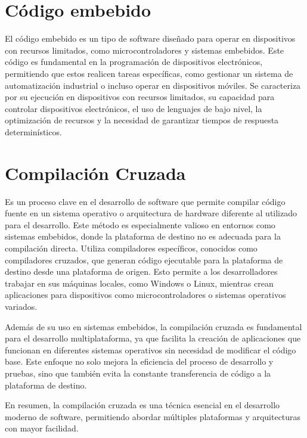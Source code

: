 \section{Código embebido}

El código embebido es un tipo de software diseñado para operar en dispositivos con recursos limitados, como microcontroladores y sistemas embebidos. Este código es fundamental en la programación de dispositivos electrónicos, permitiendo que estos realicen tareas específicas, como gestionar un sistema de automatización industrial o incluso operar en dispositivos móviles. Se caracteriza por su ejecución en dispositivos con recursos limitados, su capacidad para controlar dispositivos electrónicos, el uso de lenguajes de bajo nivel, la optimización de recursos y la necesidad de garantizar tiempos de respuesta 
determinísticos.

\section{Compilación Cruzada}

Es un proceso clave en el desarrollo de software que permite compilar código fuente en un sistema operativo o arquitectura de hardware diferente al utilizado para el desarrollo. Este método es especialmente valioso en entornos como sistemas embebidos, donde la plataforma de destino no es adecuada para la compilación directa. Utiliza compiladores específicos, conocidos como compiladores cruzados, que generan código ejecutable para la plataforma de destino desde una plataforma de origen. Esto permite a los desarrolladores trabajar en sus máquinas locales, como Windows o Linux, mientras crean aplicaciones para dispositivos como microcontroladores o sistemas operativos variados.

Además de su uso en sistemas embebidos, la compilación cruzada es fundamental para el desarrollo multiplataforma, ya que facilita la creación de aplicaciones que funcionan en diferentes sistemas operativos sin necesidad de modificar el código base. Este enfoque no solo mejora la eficiencia del proceso de desarrollo y pruebas, sino que también evita la constante transferencia de código a la plataforma de destino. 

En resumen, la compilación cruzada es una técnica esencial en el desarrollo moderno de software, permitiendo abordar múltiples plataformas y arquitecturas con mayor facilidad.

